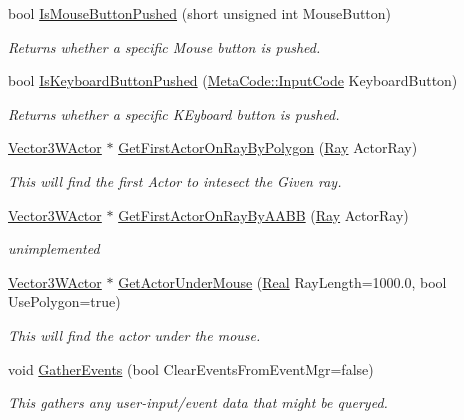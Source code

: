 \begin{DoxyCompactItemize}
bool \hyperlink{classphys_1_1WorldQueryTool_af277b578432dfaefffbc4fd9bb80ca64}{IsMouseButtonPushed} (short unsigned int MouseButton)
\begin{DoxyCompactList}\small\item\em Returns whether a specific Mouse button is pushed. \item\end{DoxyCompactList}\item 
bool \hyperlink{classphys_1_1WorldQueryTool_a8343f54b900adb316ddc6de5405da328}{IsKeyboardButtonPushed} (\hyperlink{classphys_1_1MetaCode_a3e501cbb5bf0f6f1fdb7211465bda8d8}{MetaCode::InputCode} KeyboardButton)
\begin{DoxyCompactList}\small\item\em Returns whether a specific KEyboard button is pushed. \item\end{DoxyCompactList}\item 
\hyperlink{classphys_1_1Vector3WActor}{Vector3WActor} $\ast$ \hyperlink{classphys_1_1WorldQueryTool_a256022003d64756b0b5c5706aefd5139}{GetFirstActorOnRayByPolygon} (\hyperlink{classphys_1_1Ray}{Ray} ActorRay)
\begin{DoxyCompactList}\small\item\em This will find the first Actor to intesect the Given ray. \item\end{DoxyCompactList}\item 
\hyperlink{classphys_1_1Vector3WActor}{Vector3WActor} $\ast$ \hyperlink{classphys_1_1WorldQueryTool_a67575416c2e9c652bbd873649ee38baf}{GetFirstActorOnRayByAABB} (\hyperlink{classphys_1_1Ray}{Ray} ActorRay)
\begin{DoxyCompactList}\small\item\em unimplemented \item\end{DoxyCompactList}\item 
\hyperlink{classphys_1_1Vector3WActor}{Vector3WActor} $\ast$ \hyperlink{classphys_1_1WorldQueryTool_a8efba55076bad228d7cda0b82895f32a}{GetActorUnderMouse} (\hyperlink{namespacephys_af7eb897198d265b8e868f45240230d5f}{Real} RayLength=1000.0, bool UsePolygon=true)
\begin{DoxyCompactList}\small\item\em This will find the actor under the mouse. \item\end{DoxyCompactList}\item 
void \hyperlink{classphys_1_1WorldQueryTool_ae387ff047f3cdf408d8959b8cbf4cc57}{GatherEvents} (bool ClearEventsFromEventMgr=false)
\begin{DoxyCompactList}\small\item\em This gathers any user-\/input/event data that might be queryed. \item\end{DoxyCompactList}\end{DoxyCompactItemize}



